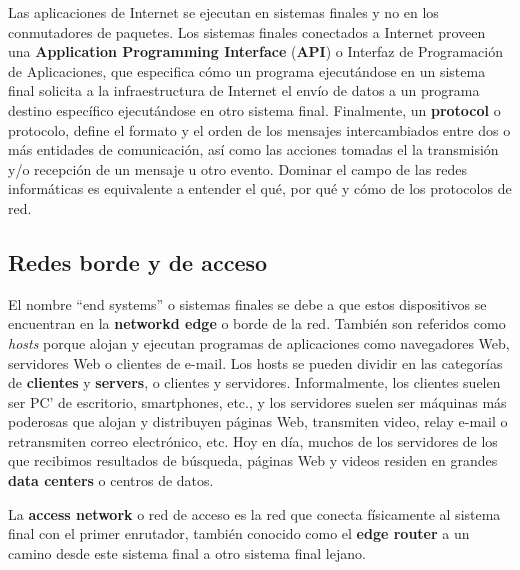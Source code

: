 Las aplicaciones de Internet se ejecutan en sistemas finales y no en los conmutadores de paquetes. Los sistemas finales conectados a Internet proveen una \textbf{Application Programming Interface} (\textbf{API}) o Interfaz de Programación de Aplicaciones, que especifica cómo un programa ejecutándose en un sistema final solicita a la infraestructura de Internet el envío de datos a un programa destino específico ejecutándose en otro sistema final. Finalmente, un \textbf{protocol} o protocolo, define el formato y el orden de los mensajes intercambiados entre dos o más entidades de comunicación, así como las acciones tomadas el la transmisión y/o recepción de un mensaje u otro evento. Dominar el campo de las redes informáticas es equivalente a entender el qué, por qué y cómo de los protocolos de red.

\subsection{Redes borde y de acceso}

El nombre ``end systems'' o sistemas finales se debe a que estos dispositivos se encuentran en la \textbf{networkd edge} o borde de la red. También son referidos como \textit{hosts} porque alojan y ejecutan programas de aplicaciones como navegadores Web, servidores Web o clientes de e-mail. Los hosts se pueden dividir en las categorías de \textbf{clientes} y \textbf{servers}, o clientes y servidores. Informalmente, los clientes suelen ser PC' de escritorio, smartphones, etc., y los servidores suelen ser máquinas más poderosas que alojan y distribuyen páginas Web, transmiten video, relay e-mail o retransmiten correo electrónico, etc. Hoy en día, muchos de los servidores de los que recibimos resultados de búsqueda, páginas Web y videos residen en grandes \textbf{data centers} o centros de datos.
\bigskip

La \textbf{access network} o red de acceso es la red que conecta físicamente al sistema final con el primer enrutador, también conocido como el \textbf{edge router} a un camino desde este sistema final a otro sistema final lejano.
